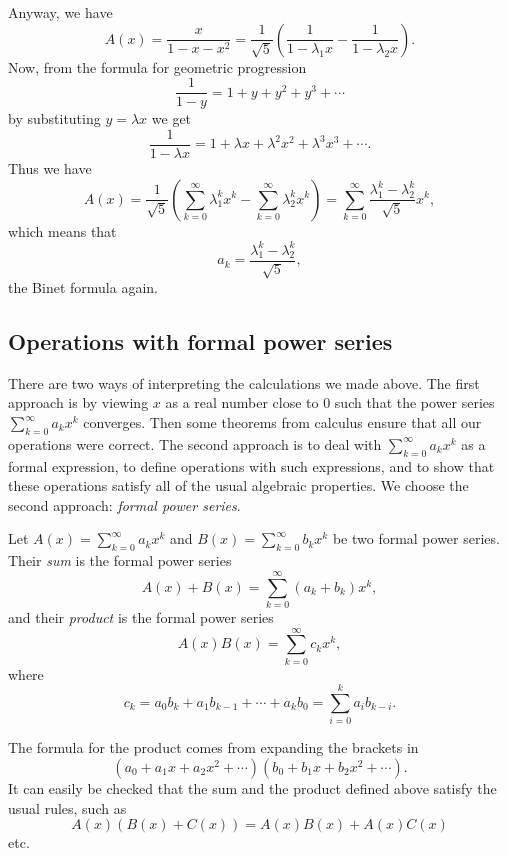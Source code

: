 \begin{page}
Anyway, we have
\[
A(x) = \frac{x}{1-x-x^2} = \frac{1}{\sqrt{5}} \left( \frac{1}{1-\lambda_1x} - \frac{1}{1-\lambda_2x} \right).
\]
Now, from the formula for geometric progression
\[
\frac{1}{1-y} = 1 + y + y^2 + y^3 + \cdots
\]
by substituting $y = \lambda x$ we get
\[
\frac{1}{1 - \lambda x} = 1 + \lambda x + \lambda^2 x^2 + \lambda^3 x^3 + \cdots.
\]
Thus we have
\[
A(x) = \frac{1}{\sqrt{5}} \left( \sum_{k=0}^\infty \lambda_1^kx^k - \sum_{k=0}^\infty \lambda_2^kx^k \right)
= \sum_{k=0}^\infty \frac{\lambda_1^k - \lambda_2^k}{\sqrt{5}} x^k,
\]
which means that
\[
a_k = \frac{\lambda_1^k - \lambda_2^k}{\sqrt{5}},
\]
the Binet formula again.


\subsection{Operations with formal power series}
\label{sec:OperFPS}
There are two ways of interpreting the calculations we made above.
The first approach is by viewing $x$ as a real number close to $0$ such that the power series $\sum_{k=0}^\infty a_k x^k$ converges.
Then some theorems from calculus ensure that all our operations were correct.
The second approach is to deal with $\sum_{k=0}^\infty a_k x^k$ as a formal expression,
to define operations with such expressions, and to show that these operations satisfy all of the usual algebraic properties.
We choose the second approach: \emph{formal power series}.


\end{page}

\begin{page}

\begin{dfn}
Let $A(x) = \sum_{k=0}^\infty a_k x^k$ and $B(x) = \sum_{k=0}^\infty b_k x^k$ be two formal power series.
Their \emph{sum} is the formal power series
\[
A(x) + B(x) = \sum_{k=0}^\infty (a_k + b_k)x^k,
\]
and their \emph{product} is the formal power series
\[
A(x)B(x) = \sum_{k=0}^\infty c_k x^k,
\]
where
\[
c_k = a_0b_k + a_1b_{k-1} + \cdots + a_kb_0 = \sum_{i=0}^k a_i b_{k-i}.
\]
\end{dfn}

\end{page}

\begin{page}

The formula for the product comes from expanding the brackets in
\[
(a_0 + a_1 x + a_2 x^2 + \cdots)(b_0 + b_1 x + b_2 x^2 + \cdots).
\]
It can easily be checked that the sum and the product defined above satisfy the usual rules, such as
\[
A(x)(B(x) + C(x)) = A(x)B(x) + A(x)C(x)
\]
etc.


\end{page}

